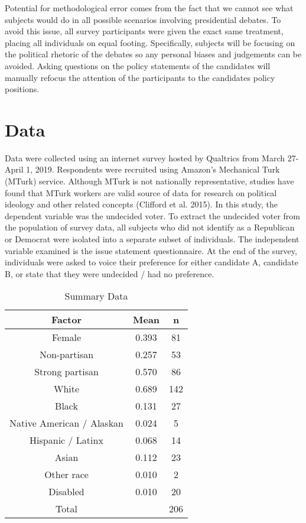 \documentclass[12pt]{article}
\begin{document}
{{{{Potential for methodological error comes from the fact that we cannot see what subjects would do in all possible scenarios involving presidential debates. To avoid this issue, all survey participants were given the exact same treatment, placing all individuals on equal footing. Specifically, subjects will be focusing on the political rhetoric of the debates so any personal biases and judgements can be avoided. Asking questions on the policy statements of the candidates will manually refocus the attention of the participants to the candidates policy positions.\\


\section*{Data}

Data were collected using an internet survey hosted by Qualtrics from March 27-April 1, 2019. Respondents were recruited using Amazon's Mechanical Turk (MTurk) service. Although MTurk is not nationally representative, studies have found that MTurk workers are valid source of data for research on political ideology and other related concepts (Clifford et al. 2015). In this study, the dependent variable was the undecided voter. To extract the undecided voter from the population of survey data, all subjects who did not identify as a Republican or Democrat were isolated into a separate subset of individuals. The independent variable examined is the issue statement questionnaire. At the end of the survey, individuals were asked to voice their preference for either candidate A, candidate B, or state that they were undecided / had no preference. \\

\begin{table}[h]
\caption{Summary Data}
\centering
 \begin{tabular}{||c c c||}
 \hline
 Factor & Mean & n \\ [0.5ex]
 \hline\hline
 Female & 0.393 & 81 \\
 Non-partisan  & 0.257 & 53 \\
 Strong partisan  & 0.570 & 86 \\
 White  & 0.689 & 142 \\
 Black & 0.131 & 27 \\
 Native American / Alaskan & 0.024 & 5 \\
 Hispanic / Latinx  & 0.068 & 14 \\
 Asian & 0.112 & 23 \\
 Other race & 0.010 & 2 \\
 Disabled  & 0.010 & 20 \\ 
 Total & & 206 \\[1ex]
 \hline
 \end{tabular}
 \end{table}


}}}}
\end{document}
